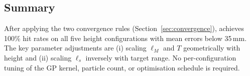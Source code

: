 \subsection{Summary}
\label{sec:study1:summary}

After applying the two convergence rules (Section~\ref{sec:convergence}), \mcpilot{}
achieves 100\% hit rates on all five height configurations with mean errors below
35\,mm.
The key parameter adjustments are (i) scaling $\ell_M$ and $T$ geometrically with
height and (ii) scaling $\ell_s$ inversely with target range.
No per-configuration tuning of the GP kernel, particle count, or optimisation
schedule is required.
